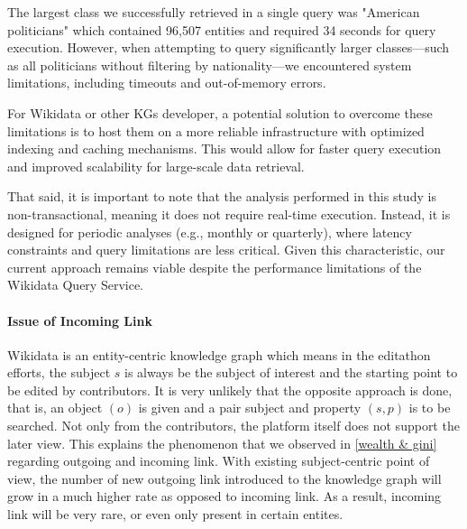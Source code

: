 The largest class we successfully retrieved in a single query was "American politicians" which contained 96,507 entities and required 34 seconds for query execution. However, when attempting to query significantly larger classes—such as all politicians without filtering by nationality—we encountered system limitations, including timeouts and out-of-memory errors.

For Wikidata or other KGs developer, a potential solution to overcome these limitations is to host them on a more reliable infrastructure with optimized indexing and caching mechanisms. This would allow for faster query execution and improved scalability for large-scale data retrieval.

That said, it is important to note that the analysis performed in this study is non-transactional, meaning it does not require real-time execution. Instead, it is designed for periodic analyses (e.g., monthly or quarterly), where latency constraints and query limitations are less critical. Given this characteristic, our current approach remains viable despite the performance limitations of the Wikidata Query Service.


\paragraph{Issue of Incoming Link}
Wikidata is an entity-centric knowledge graph which means in the editathon efforts, the subject \(s\) is always be the subject of interest and the starting point to be edited by contributors. It is very unlikely that the opposite approach is done, that is, an object \((o)\) is given and a pair subject and property \((s, p)\) is to be searched. Not only from the contributors, the platform itself does not support the later view. This explains the phenomenon that we observed in \autoref{wealth & gini} regarding outgoing and incoming link. With existing subject-centric point of view, the number of new outgoing link introduced to the knowledge graph will grow in a much higher rate as opposed to incoming link. As a result, incoming link will be very rare, or even only present in certain entites.

